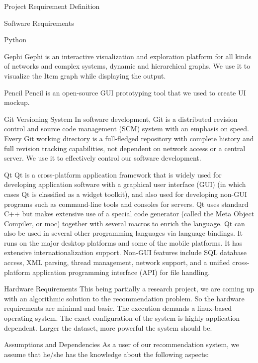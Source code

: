 \documentclass{report}
\begin{document}
\begin{projChapter}{Project Requirement Definition}
\begin{projSection}{Software Requirements}
\begin{projSubSection}{Python}
\end{projSubSection}
\begin{projSubSection}{Gephi}
                Gephi is an interactive visualization and exploration platform for all kinds of networks  and complex systems, dynamic and hierarchical graphs. We use it to visualize the Item graph while displaying the output.
            \end{projSubSection}
\begin{projSubSection}{Pencil}
                Pencil is an open-source GUI prototyping tool that we used to create UI mockup.
            \end{projSubSection}
\begin{projSubSection}{Git Versioning System}
                In software development, Git is a distributed revision control and source code management (SCM) system with an emphasis on speed. Every Git working directory is a full-fledged repository with complete history and full revision tracking capabilities, not dependent on network access or a central server. We use it to effectively control our software development.
            \end{projSubSection}
\begin{projSubSection}{Qt}
                Qt is a cross-platform application framework that is widely used for developing application software with a graphical user interface (GUI) (in which cases Qt is classified as a widget toolkit), and also used for developing non-GUI programs such as command-line tools and consoles for servers. Qt uses standard C++ but makes extensive use of a special code generator (called the Meta Object Compiler, or moc) together with several macros to enrich the language. Qt can also be used in several other programming languages via language bindings. It runs on the major desktop platforms and some of the mobile platforms. It has extensive internationalization support. Non-GUI features include SQL database access, XML parsing, thread management, network support, and a unified cross-platform application programming  interface (API) for file handling.
            \end{projSubSection}
\end{projSection}
\begin{projSection}{Hardware Requirements}
            This being partially a research project, we are coming up with an algorithmic solution to the recommendation problem. So the hardware requirements are minimal and basic. The execution demands a linux-based operating system. The exact configuration of the system is highly application dependent. Larger the dataset, more powerful the system should be.
        \end{projSection}
\begin{projSection}{Assumptions and Dependencies}
            As a user of our recommendation system, we assume that he/she has the knowledge about the following aspects:
            

\end{projSection}
\end{projChapter}
\end{document}
